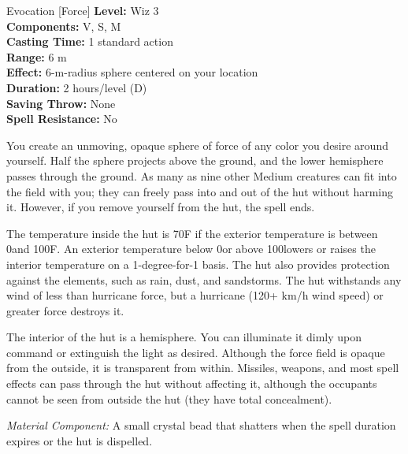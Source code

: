 {Evocation [Force]}
{
	\textbf{Level:}
	Wiz 3\\
	\textbf{Components:}
	V, S, M\\
	\textbf{Casting Time:}
	1 standard action\\
	\textbf{Range:}
	6 m\\
	\textbf{Effect:}
	6-m-radius sphere centered on your location\\
	\textbf{Duration:}
	2 hours/level (D)\\
	\textbf{Saving Throw:}
	None\\
	\textbf{Spell Resistance:}
	No\\
}
{
	You create an unmoving, opaque sphere of force of any color you desire around yourself. Half the sphere projects above the ground, and the lower hemisphere passes through the ground. As many as nine other Medium creatures can fit into the field with you; they can freely pass into and out of the hut without harming it. However, if you remove yourself from the hut, the spell ends.

	The temperature inside the hut is 70\textdegree F if the exterior temperature is between 0\textdegree and 100\textdegree F. An exterior temperature below 0\textdegree or above 100\textdegree lowers or raises the interior temperature on a 1-degree-for-1 basis. The hut also provides protection against the elements, such as rain, dust, and sandstorms. The hut withstands any wind of less than hurricane force, but a hurricane (120+ km/h wind speed) or greater force destroys it.

	The interior of the hut is a hemisphere. You can illuminate it dimly upon command or extinguish the light as desired. Although the force field is opaque from the outside, it is transparent from within. Missiles, weapons, and most spell effects can pass through the hut without affecting it, although the occupants cannot be seen from outside the hut (they have total concealment).

	\textit{Material Component:}
	A small crystal bead that shatters when the spell duration expires or the hut is dispelled.

}
